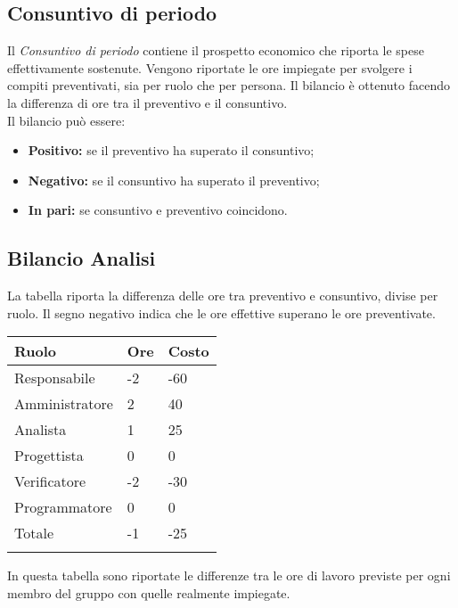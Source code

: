\begin{flushleft}
    \chapter{Consuntivo di periodo}
    Il \textit{Consuntivo di periodo} contiene il prospetto economico che riporta le spese effettivamente sostenute. Vengono riportate le ore impiegate per svolgere i compiti preventivati, sia per
    ruolo che per persona. Il bilancio è ottenuto facendo la differenza di ore tra il preventivo e il consuntivo.\\
    Il bilancio può essere:
    \begin{itemize}
        \item \textbf{Positivo:} se il preventivo ha superato il consuntivo;
        \item \textbf{Negativo:} se il consuntivo ha superato il preventivo;
        \item \textbf{In pari:} se consuntivo e preventivo coincidono.
    \end{itemize}

    \section{Bilancio Analisi}
    La tabella riporta la differenza delle ore tra preventivo e consuntivo, divise per ruolo. Il segno negativo indica che le ore effettive superano le ore preventivate.  
      
\newpage
        \begin{tabularx}{\textwidth}{|l|l|l|}
        \hline
        Ruolo          & Ore & Costo \\ \hline
        Responsabile   & -2  & -60   \\ \hline
        Amministratore & 2   & 40    \\ \hline
        Analista       & 1   & 25    \\ \hline
        Progettista    & 0   & 0     \\ \hline
        Verificatore   & -2  & -30   \\ \hline
        Programmatore  & 0   & 0     \\ \hline
        Totale         & -1   & -25   \\ \hline
        \caption{Differenza delle ore tra preventivo e consultivo divise per ruolo}    
    \end{tabularx}



    In questa tabella  sono riportate le differenze tra le ore di lavoro previste per ogni membro del gruppo con quelle realmente impiegate.\\
   


\end{flushleft}
